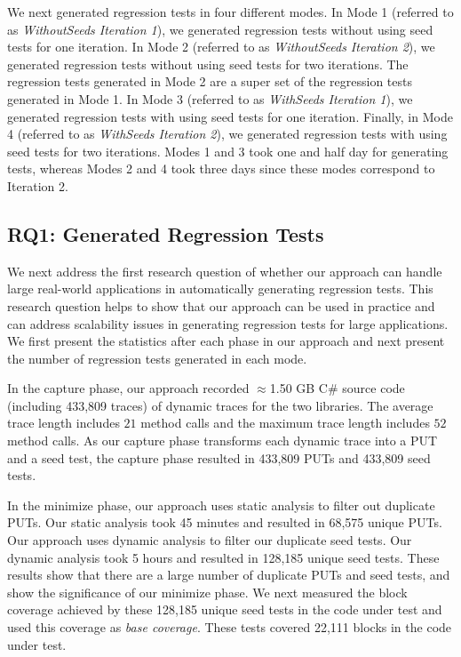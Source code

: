 We next generated regression tests in four different modes. In Mode 1 (referred to as \emph{WithoutSeeds Iteration 1}), we generated regression tests without using seed tests for one iteration. In Mode 2 (referred to as \emph{WithoutSeeds Iteration 2}), we generated regression tests without using seed tests for two iterations. The regression tests 
generated in Mode 2 are a super set of the regression tests generated in Mode 1. In Mode 3 (referred to as \emph{WithSeeds Iteration 1}), we generated regression tests with using seed tests for one iteration. Finally, in Mode 4 (referred to as \emph{WithSeeds Iteration 2}), we generated regression tests with using seed tests for two iterations. Modes 1 and 3 took one and half day for generating tests, whereas Modes 2 and 4 took three days since these modes correspond to Iteration 2.

\subsection{RQ1: Generated Regression Tests}

We next address the first research question of whether our approach can handle large real-world applications in automatically generating regression tests. This research question helps to show that our approach can be used in practice and can address scalability issues in generating regression tests for large applications. We first present the statistics after each phase in our approach and next present the number of regression tests generated in each mode.

In the capture phase, our approach recorded $\approx$1.50 GB C\# source code (including 433,809 traces) of dynamic traces for the two libraries. The average trace length includes $21$ method calls and the maximum trace length includes $52$ method calls. As our capture phase transforms each dynamic trace into a PUT and a seed test, the capture phase resulted in 433,809 PUTs and 433,809 seed tests. 

In the minimize phase, our approach uses static analysis to filter out duplicate PUTs. Our static analysis took 45 minutes and resulted in 68,575 unique PUTs. Our approach uses dynamic analysis to filter our duplicate seed tests. Our dynamic analysis took 5 hours and resulted in 128,185 unique seed tests. These results show that there are a large number of duplicate PUTs and seed tests, and show the significance of our minimize phase. We next measured the block coverage achieved by these 128,185 unique seed tests
in the code under test and used this coverage as \emph{base coverage}. These tests covered 22,111 blocks in the code under test. 

